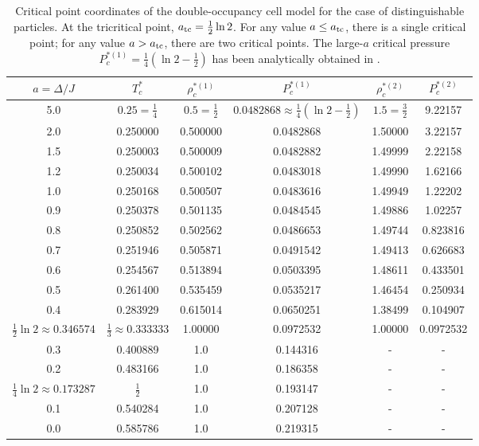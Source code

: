 \documentclass[pdflatex,sn-mathphys-num]{sn-jnl}%
\theoremstyle{thmstyleone}%
\theoremstyle{thmstyletwo}%
\theoremstyle{thmstylethree}%
\begin{document}
	\begin{table}[h]
		\centering
		\caption{Critical point coordinates of the double-occupancy cell model for the case of distinguishable particles. At the tricritical point, $a_{\rm tc} = \frac{1}{2} \ln 2$. For any value $a \leq a_{\rm tc}$, there is a single critical point; for any value $a > a_{\rm tc}$, there are two critical points. The large-$a$ critical pressure $P^{*(1)}_c=\frac{1}{4}\left(\ln 2 - \frac{1}{2}\right)$ has been analytically obtained in \cite[Sec.~9.4]{DKPRS26arxiv}.}
		\begin{tabular}{c|c|c|c|c|c}
			\toprule
			$a=\Delta/J$ & $T^*_c$ & $\rho^{*(1)}_c $ & $P^{*(1)}_c$ & $\rho^{*(2)}_c$ & $P^{*(2)}_c$\\
			\midrule
			5.0 & $0.25 = \frac{1}{4}$ & $0.5 = \frac{1}{2}$ & $0.0482868 \approx \frac{1}{4}\left(\ln 2 - \frac{1}{2}\right)$ & $1.5 = \frac{3}{2}$ & 9.22157 \\
			2.0 & 0.250000 & 0.500000 & 0.0482868 & 1.50000 & 3.22157 \\
			1.5 & 0.250003 & 0.500009 & 0.0482882 & 1.49999 & 2.22158 \\
			1.2 & 0.250034 & 0.500102 & 0.0483018 & 1.49990 & 1.62166 \\
			1.0 & 0.250168 & 0.500507 & 0.0483616 & 1.49949 & 1.22202 \\
			0.9 & 0.250378 & 0.501135 & 0.0484545 & 1.49886 & 1.02257 \\
			0.8 & 0.250852 & 0.502562 & 0.0486653 & 1.49744 & 0.823816 \\
			0.7 & 0.251946 & 0.505871 & 0.0491542 & 1.49413 & 0.626683 \\
			0.6 & 0.254567 & 0.513894 & 0.0503395 & 1.48611 & 0.433501 \\
			0.5 & 0.261400 & 0.535459 & 0.0535217 & 1.46454 & 0.250934 \\
			0.4 & 0.283929 & 0.615014 & 0.0650251 & 1.38499 & 0.104907 \\
			$\frac{1}{2}\ln 2 \approx 0.346574$ & $\frac{1}{3} \approx 0.333333$ & 1.00000 & 0.0972532 & 1.00000 & 0.0972532\\
			0.3 & 0.400889 & 1.0 & 0.144316 & - & - \\
			0.2 & 0.483166 & 1.0 & 0.186358 & - & - \\
			$\frac{1}{4} \ln 2 \approx 0.173287$ & $\frac{1}{2}$ & 1.0 & 0.193147 & - & - \\
			0.1 & 0.540284 & 1.0 & 0.207128 & - & - \\
			0.0 & 0.585786 & 1.0 & 0.219315 & - & - \\
			\bottomrule
		\end{tabular}
		\label{tab:critical-points}
	\end{table}
\end{document}
